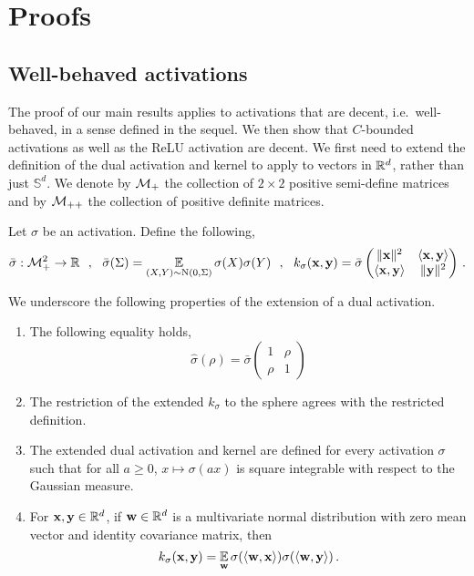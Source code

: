 \section{Proofs}

\subsection{Well-behaved activations}
%
The proof of our main results applies to activations that are decent,
i.e.\ well-behaved, in a sense defined in the sequel.  We then show that
$C$-bounded activations as well as the ReLU activation are decent. We
first need to extend the definition of the dual activation and kernel to apply
to vectors in ${\mathbb R}^d$, rather than just $\mathbb{S}^d$. We denote by
${\cal M}_+$  the collection of $2\times 2$ positive semi-define matrices and by
${\cal M}_{++}$ the collection of positive definite matrices.
\begin{definition}
Let $\sigma$ be an activation. Define the following,
\[
\bar\sigma:{\cal M}_{+}^2\to{\mathbb R} ~~ , ~~
\bar\sigma(\Sigma)=\operatorname*{\mathbb{E}}_{(X,Y)\sim\text{N}(0,\Sigma)}\sigma(X)\sigma(Y) ~~ , ~~
k_\sigma({\mathbf x},{\mathbf y})=\bar\sigma\begin{pmatrix}
\|{\mathbf x}\|^2 & \langle {\mathbf x},{\mathbf y} \rangle
\\
\langle {\mathbf x},{\mathbf y} \rangle & \|{\mathbf y}\|^2
\end{pmatrix} \,.
\]
\end{definition}
\noindent
We underscore the following properties of the extension of a
dual activation.
\begin{enumerate}[label=(\alph*)]
\item The following equality holds,
	$$\hat\sigma(\rho)=\bar\sigma\begin{pmatrix}
		1 & \rho \\
		\rho & 1
	\end{pmatrix}$$

\item The restriction of the extended $k_\sigma$ to the sphere agrees
with the restricted definition.

\item The extended dual activation and kernel are defined for every
	activation $\sigma$ such that for all $a\ge 0$, $x\mapsto \sigma(ax)$ is
	square integrable with respect to the Gaussian measure.

\item For ${\mathbf x},{\mathbf y}\in{\mathbb R}^d$, if ${\mathbf w}\in{\mathbb R}^d$ is a multivariate normal
	distribution with zero mean vector and identity covariance matrix,
	then
	$$k_\sigma({\mathbf x},{\mathbf y})=\operatorname*{\mathbb{E}}_{{\mathbf w}}\sigma(\langle {\mathbf w},{\mathbf x} \rangle)\sigma(\langle {\mathbf w},{\mathbf y} \rangle) \,.$$
\end{enumerate}

